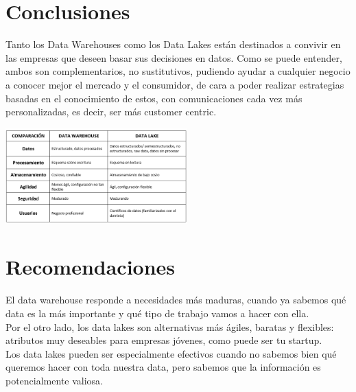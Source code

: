 \documentclass[twoside,twocolumn]{article}
\begin{document}
\section{Conclusiones}
\noindent Tanto los Data Warehouses como los Data Lakes están destinados a convivir en las empresas que deseen basar sus decisiones en datos. Como se puede entender, ambos son complementarios, no sustitutivos, pudiendo ayudar a cualquier negocio a conocer mejor el mercado y el consumidor, de cara a poder realizar estrategias basadas en el conocimiento de estos, con comunicaciones cada vez más personalizadas, es decir, ser más customer centric.
\begin{center}
    \includegraphics[width=7cm]{./img/img7.png}
\end{center}


\section{Recomendaciones}
\noindent El data warehouse responde a necesidades más maduras, cuando ya sabemos qué data es la más importante y qué tipo de trabajo vamos a hacer con ella.\\[0.1in]
Por el otro lado, los data lakes son alternativas más ágiles, baratas y flexibles: atributos muy deseables para empresas jóvenes, como puede ser tu startup.\\[0.1in]
Los data lakes pueden ser especialmente efectivos cuando no sabemos bien qué queremos hacer con toda nuestra data, pero sabemos que la información es potencialmente valiosa.

\end{document}
